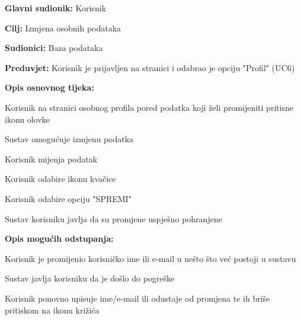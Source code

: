 					\noindent {}
					\begin{packed_item}
	\item \textbf{Glavni sudionik:} Korisnik
	\item  \textbf{Cilj:} Izmjena osobnih podataka
	\item  \textbf{Sudionici:} Baza podataka
	\item  \textbf{Preduvjet:} Korisnik je prijavljen na stranici i odabrao je opciju "Profil" (UC6)
	\item  \textbf{Opis osnovnog tijeka:}
	
	\item[] \begin{packed_enum}
		
		\item Korisnik na stranici osobnog profila pored podatka koji želi promijeniti pritisne ikonu olovke
		\item Sustav omogućuje izmjenu podatka
		\item Korisnik mijenja podatak
		\item Korisnik odabire ikonu kvačice
		\item Korisnik odabire opciju "SPREMI"
		\item Sustav korisniku javlja da su promjene uspješno pohranjene
	\end{packed_enum}
	
	\item  \textbf{Opis mogućih odstupanja:}
	
	\item[] \begin{packed_item}
		
		\item[4.a] Korisnik je promijenio korisničko ime ili e-mail u nešto što već postoji u sustavu
		\item[] \begin{packed_enum}
			
			\item Sustav javlja korisniku da je došlo do pogreške
			\item Korisnik ponovno upisuje ime/e-mail ili odustaje od promjena te ih briše pritiskom na ikonu križića
			
		\end{packed_enum}
	\end{packed_item}
\end{packed_item}

